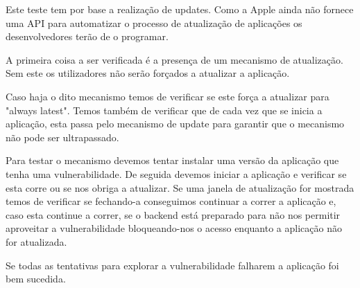 Este teste tem por base a realização de updates. Como a Apple ainda não fornece uma API para automatizar o processo de atualização de aplicações os desenvolvedores terão de o programar.\par
\hfill\par

A primeira coisa a ser verificada é a presença de um mecanismo de atualização. Sem este os utilizadores não serão forçados a atualizar a aplicação.\par
Caso haja o dito mecanismo temos de verificar se este força a atualizar para "always latest". Temos também de verificar que de cada vez que se inicia a aplicação, esta passa pelo mecanismo de update para garantir que o mecanismo não pode ser ultrapassado.\par
\hfill\par

Para testar o mecanismo devemos tentar instalar uma versão da aplicação que tenha uma vulnerabilidade. De seguida devemos iniciar a aplicação e verificar se esta corre ou se nos obriga a atualizar. Se uma janela de atualização for mostrada temos de verificar se fechando-a conseguimos continuar a correr a aplicação e, caso esta continue a correr, se o backend está preparado para não nos permitir aproveitar a vulnerabilidade bloqueando-nos o acesso enquanto a aplicação não for atualizada.\par

Se todas as tentativas para explorar a vulnerabilidade falharem a aplicação foi bem sucedida.

